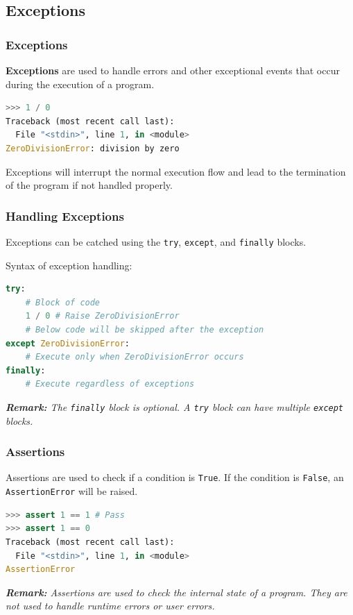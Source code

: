 \documentclass[beamer, en, version=2.0]{huangfusl-template}
\begin{document}
    \subsection{Exceptions}
    \begin{frame}[fragile]
        \frametitle{Exceptions}

        \textbf{Exceptions} are used to handle errors and other exceptional events that occur during the execution of a program.

\begin{lstlisting}[language=python]
>>> 1 / 0
Traceback (most recent call last):
  File "<stdin>", line 1, in <module>
ZeroDivisionError: division by zero
\end{lstlisting}

        Exceptions will interrupt the normal execution flow and lead to the termination of the program if not handled properly.
    \end{frame}
    \begin{frame}[fragile]
        \frametitle{Handling Exceptions}

        Exceptions can be catched using the {\footnotesize\verb|try|}, {\footnotesize\verb|except|}, and {\footnotesize\verb|finally|} blocks.

        Syntax of exception handling:

\begin{lstlisting}[language=python]
try:
    # Block of code
    1 / 0 # Raise ZeroDivisionError
    # Below code will be skipped after the exception
except ZeroDivisionError:
    # Execute only when ZeroDivisionError occurs
finally:
    # Execute regardless of exceptions
\end{lstlisting}

        {\footnotesize\itshape\textbf{Remark:} The {\footnotesize\verb|finally|} block is optional. A {\footnotesize\verb|try|} block can have multiple {\footnotesize\verb|except|} blocks.}
    \end{frame}
    \begin{frame}[fragile]
        \frametitle{Assertions}

        Assertions are used to check if a condition is {\footnotesize\verb|True|}. If the condition is {\footnotesize\verb|False|}, an {\footnotesize\verb|AssertionError|} will be raised.

\begin{lstlisting}[language=python]
>>> assert 1 == 1 # Pass
>>> assert 1 == 0
Traceback (most recent call last):
  File "<stdin>", line 1, in <module>
AssertionError
\end{lstlisting}

    {\footnotesize\itshape\textbf{Remark:} Assertions are used to check the internal state of a program. They are not used to handle runtime errors or user errors.}
    \end{frame}
\end{document}
